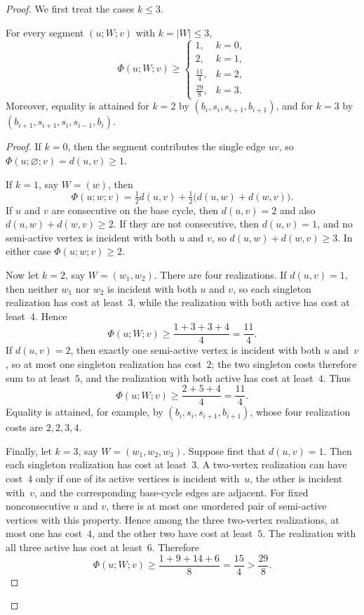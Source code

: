 \documentclass[12pt,a4paper,oneside]{report}
\begin{document}
\begin{proof}
We first treat the cases $k\le3$.

\begin{claim}\label{clm:short-seg}
For every segment $(u;W;v)$ with $k=|W|\le3$,
\[
    \Phi(u;W;v)
    \ge
    \begin{cases}
        1, & k=0,\\
        2, & k=1,\\
        \frac{11}{4}, & k=2,\\
        \frac{29}{8}, & k=3.
    \end{cases}
\]
Moreover, equality is attained for $k=2$ by
$(b_i,s_i,s_{i+1},b_{i+1})$, and for $k=3$ by
$(b_{i+1},s_{i+1},s_i,s_{i-1},b_i)$.
\end{claim}
\begin{proof}
If $k=0$, then the segment contributes the single edge $uv$, so
$\Phi(u;\varnothing;v)=d(u,v)\ge1$.

If $k=1$, say $W=(w)$, then
\[
    \Phi(u;w;v)
    =
    \tfrac12d(u,v)
    +\tfrac12\bigl(d(u,w)+d(w,v)\bigr).
\]
If $u$ and $v$ are consecutive on the base cycle, then $d(u,v)=2$
and also $d(u,w)+d(w,v)\ge2$.  If they are not consecutive, then
$d(u,v)=1$, and no semi-active vertex is incident with both $u$ and $v$,
so $d(u,w)+d(w,v)\ge3$.  In either case
$\Phi(u;w;v)\ge2$.

Now let $k=2$, say $W=(w_1,w_2)$.  There are four realizations.  If
$d(u,v)=1$, then neither $w_1$ nor $w_2$ is incident with both $u$ and
$v$, so each singleton realization has cost at least~$3$, while the
realization with both active has cost at least~$4$.  Hence
\[
    \Phi(u;W;v)
    \ge\frac{1+3+3+4}{4}
    =\frac{11}{4}.
\]
If $d(u,v)=2$, then exactly one semi-active vertex is incident with both
$u$ and~$v$, so at most one singleton realization has cost~$2$; the two
singleton costs therefore sum to at least~$5$, and the realization with
both active has cost at least~$4$.  Thus
\[
    \Phi(u;W;v)
    \ge\frac{2+5+4}{4}
    =\frac{11}{4}.
\]
Equality is attained, for example, by
$(b_i,s_i,s_{i+1},b_{i+1})$, whose four realization costs are
$2,2,3,4$.

Finally, let $k=3$, say $W=(w_1,w_2,w_3)$.  Suppose first that
$d(u,v)=1$.  Then each singleton realization has cost at least~$3$.
A two-vertex realization can have cost~$4$ only if one of its active vertices
is incident with~$u$, the other is incident with~$v$, and the corresponding
base-cycle edges are adjacent.  For fixed nonconsecutive $u$ and $v$, there
is at most one unordered pair of semi-active vertices with this property.
Hence among the three two-vertex realizations, at most one has cost~$4$,
and the other two have cost at least~$5$.  The realization with all three
active has cost at least~$6$.  Therefore
\[
    \Phi(u;W;v)
    \ge\frac{1+9+14+6}{8}
    =\frac{15}{4}
    >\frac{29}{8}.
\]


\end{proof}
\end{proof}
\end{document}
